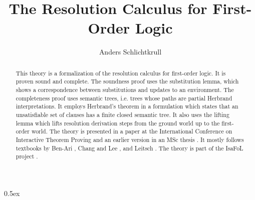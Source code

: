 \documentclass[11pt,a4paper]{article}
\begin{document}
\title{The Resolution Calculus for First-Order Logic}
\author{Anders Schlichtkrull}
\maketitle
\begin{abstract}
This theory is a formalization of the resolution calculus for first-order logic. It is proven sound and complete. The soundness proof uses the substitution lemma, which shows a correspondence between substitutions and updates to an environment. The completeness proof uses semantic trees, i.e. trees whose paths are partial Herbrand interpretations. It employs Herbrand's theorem in a formulation which states that an unsatisfiable set of clauses has a finite closed semantic tree. It also uses the lifting lemma which lifts resolution derivation steps from the ground world up to the first-order world. The theory is presented in a paper at the International Conference on Interactive Theorem Proving \cite{schlichtkrull} and an earlier version in an MSc thesis \cite{thesis}. It mostly follows textbooks by Ben-Ari \cite{ben-ari}, Chang and Lee \cite{chang}, and Leitsch \cite{leitsch}. The theory is part of the IsaFoL project \cite{isafol}.
\end{abstract}

\tableofcontents

\parindent 0pt\parskip 0.5ex





\end{document}
